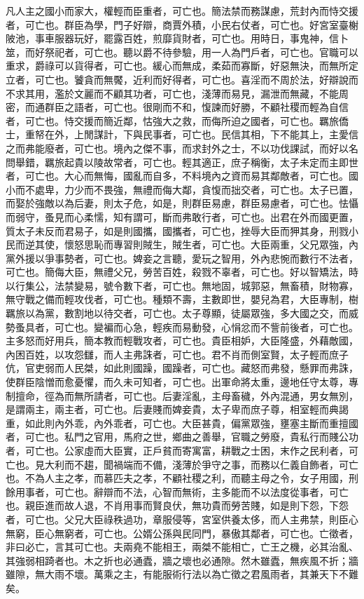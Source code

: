 
\begin{pinyinscope}
凡人主之國小而家大，權輕而臣重者，可亡也。簡法禁而務謀慮，荒封內而恃交援者，可亡也。群臣為學，門子好辯，商賈外積，小民右仗者，可亡也。好宮室臺榭陂池，事車服器玩好，罷露百姓，煎靡貨財者，可亡也。用時日，事鬼神，信卜筮，而好祭祀者，可亡也。聽以爵不待參驗，用一人為門戶者，可亡也。官職可以重求，爵祿可以貨得者，可亡也。緩心而無成，柔茹而寡斷，好惡無決，而無所定立者，可亡也。饕貪而無饜，近利而好得者，可亡也。喜淫而不周於法，好辯說而不求其用，濫於文麗而不顧其功者，可亡也，淺薄而易見，漏泄而無藏，不能周密，而通群臣之語者，可亡也。很剛而不和，愎諫而好勝，不顧社稷而輕為自信者，可亡也。恃交援而簡近鄰，怙強大之救，而侮所迫之國者，可亡也。羈旅僑士，重帑在外，上閒謀計，下與民事者，可亡也。民信其相，下不能其上，主愛信之而弗能廢者，可亡也。境內之傑不事，而求封外之士，不以功伐課試，而好以名問舉錯，羈旅起貴以陵故常者，可亡也。輕其適正，庶子稱衡，太子未定而主即世者，可亡也。大心而無悔，國亂而自多，不料境內之資而易其鄰敵者，可亡也。國小而不處卑，力少而不畏強，無禮而侮大鄰，貪愎而拙交者，可亡也。太子已置，而娶於強敵以為后妻，則太子危，如是，則群臣易慮，群臣易慮者，可亡也。怯懾而弱守，蚤見而心柔懦，知有謂可，斷而弗敢行者，可亡也。出君在外而國更置，質太子未反而君易子，如是則國攜，國攜者，可亡也，挫辱大臣而狎其身，刑戮小民而逆其使，懷怒思恥而專習則賊生，賊生者，可亡也。大臣兩重，父兄眾強，內黨外援以爭事勢者，可亡也。婢妾之言聽，愛玩之智用，外內悲惋而數行不法者，可亡也。簡侮大臣，無禮父兄，勞苦百姓，殺戮不辜者，可亡也。好以智矯法，時以行集公，法禁變易，號令數下者，可亡也。無地固，城郭惡，無畜積，財物寡，無守戰之備而輕攻伐者，可亡也。種類不壽，主數即世，嬰兒為君，大臣專制，樹羈旅以為黨，數割地以待交者，可亡也。太子尊顯，徒屬眾強，多大國之交，而威勢蚤具者，可亡也。變褊而心急，輕疾而易動發，心悁忿而不訾前後者，可亡也。主多怒而好用兵，簡本教而輕戰攻者，可亡也。貴臣相妒，大臣隆盛，外藉敵國，內困百姓，以攻怨讎，而人主弗誅者，可亡也。君不肖而側室賢，太子輕而庶子伉，官吏弱而人民桀，如此則國躁，國躁者，可亡也。藏怒而弗發，懸罪而弗誅，使群臣陰憎而愈憂懼，而久未可知者，可亡也。出軍命將太重，邊地任守太尊，專制擅命，徑為而無所請者，可亡也。后妻淫亂，主母畜穢，外內混通，男女無別，是謂兩主，兩主者，可亡也。后妻賤而婢妾貴，太子卑而庶子尊，相室輕而典謁重，如此則內外乖，內外乖者，可亡也。大臣甚貴，偏黨眾強，壅塞主斷而重擅國者，可亡也。私門之官用，馬府之世，鄉曲之善舉，官職之勞廢，貴私行而賤公功者，可亡也。公家虛而大臣實，正戶貧而寄寓富，耕戰之士困，末作之民利者，可亡也。見大利而不趨，聞禍端而不備，淺薄於爭守之事，而務以仁義自飾者，可亡也。不為人主之孝，而慕匹夫之孝，不顧社稷之利，而聽主母之令，女子用國，刑餘用事者，可亡也。辭辯而不法，心智而無術，主多能而不以法度從事者，可亡也。親臣進而故人退，不肖用事而賢良伏，無功貴而勞苦賤，如是則下怨，下怨者，可亡也。父兄大臣祿秩過功，章服侵等，宮室供養太侈，而人主弗禁，則臣心無窮，臣心無窮者，可亡也。公婿公孫與民同門，暴傲其鄰者，可亡也。亡徵者，非曰必亡，言其可亡也。夫兩堯不能相王，兩桀不能相亡，亡王之機，必其治亂、其強弱相踦者也。木之折也必通蠹，牆之壞也必通隙。然木雖蠹，無疾風不折；牆雖隙，無大雨不壞。萬乘之主，有能服術行法以為亡徵之君風雨者，其兼天下不難矣。


\end{pinyinscope}